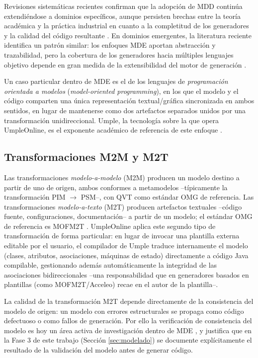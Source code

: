 \documentclass[11pt,a4paper]{article}
\begin{document}
Revisiones sistem\'aticas recientes confirman que la adopci\'on de MDD contin\'ua extendi\'endose a dominios espec\'ificos, aunque persisten brechas entre la teor\'ia acad\'emica y la pr\'actica industrial en cuanto a la completitud de los generadores y la calidad del c\'odigo resultante \cite{shamsujjoha2021}. En dominios emergentes, la literatura reciente identifica un patr\'on similar: los enfoques MDE aportan abstracci\'on y trazabilidad, pero la cobertura de los generadores hacia m\'ultiples lenguajes objetivo depende en gran medida de la extensibilidad del motor de generaci\'on \cite{naveed2024}.

Un caso particular dentro de MDE es el de los lenguajes de \emph{programaci\'on orientada a modelos} (\emph{model-oriented programming}), en los que el modelo y el c\'odigo comparten una \'unica representaci\'on textual/gr\'afica sincronizada en ambos sentidos, en lugar de mantenerse como dos artefactos separados unidos por una transformaci\'on unidireccional. Umple, la tecnolog\'ia sobre la que opera UmpleOnline, es el exponente acad\'emico de referencia de este enfoque \cite{lethbridge2021umple}.

\subsection{Transformaciones M2M y M2T}
Las transformaciones \emph{modelo-a-modelo} (M2M) producen un modelo destino a partir de uno de origen, ambos conformes a metamodelos --t\'ipicamente la transformaci\'on PIM $\to$ PSM--, con QVT como est\'andar OMG de referencia. Las transformaciones \emph{modelo-a-texto} (M2T) producen artefactos textuales --c\'odigo fuente, configuraciones, documentaci\'on-- a partir de un modelo; el est\'andar OMG de referencia es MOFM2T \cite{omg2008mofm2t}. UmpleOnline aplica este segundo tipo de transformaci\'on de forma particular: en lugar de invocar una plantilla externa editable por el usuario, el compilador de Umple traduce internamente el modelo (clases, atributos, asociaciones, m\'aquinas de estado) directamente a c\'odigo Java compilable, gestionando adem\'as autom\'aticamente la integridad de las asociaciones bidireccionales --una responsabilidad que en generadores basados en plantillas (como MOFM2T/Acceleo) recae en el autor de la plantilla--.

La calidad de la transformaci\'on M2T depende directamente de la consistencia del modelo de origen: un modelo con errores estructurales se propaga como c\'odigo defectuoso o como fallos de generaci\'on. Por ello la verificaci\'on de consistencia del modelo es hoy un \'area activa de investigaci\'on dentro de MDE \cite{marchezan2022}, y justifica que en la Fase 3 de este trabajo (Secci\'on \ref{sec:modelado}) se documente expl\'icitamente el resultado de la validaci\'on del modelo antes de generar c\'odigo.
\end{document}
